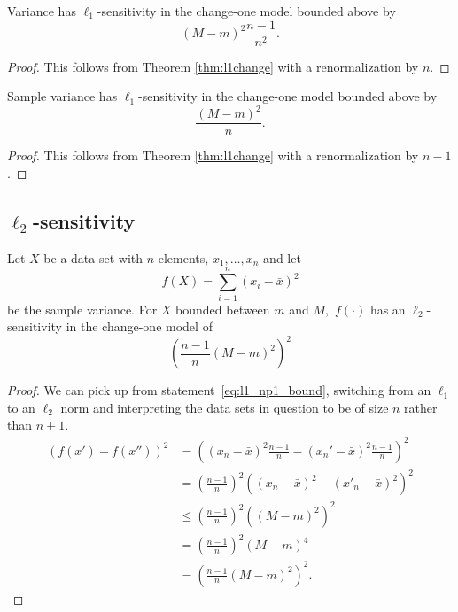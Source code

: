 \documentclass[11pt]{scrartcl} %
\begin{document}
\begin{corollary}
Variance has $\ell_1$-sensitivity in the change-one model bounded above by
$$ (M-m)^2 \frac{n-1}{n^2}. $$
\end{corollary}

\begin{proof}
This follows from Theorem \ref{thm:l1change} with a renormalization by $n$.
\end{proof}

\begin{corollary}
Sample variance has $\ell_1$-sensitivity in the change-one model bounded above by
$$ \frac{(M-m)^2 }{n}. $$
\end{corollary}

\begin{proof}
This follows from Theorem \ref{thm:l1change} with a renormalization by $n-1$.
\end{proof}

\subsection{$\ell_2$-sensitivity}
\begin{theorem}
\label{thm:l2change}
	Let $X$ be a data set with $n$ elements, $x_1, \hdots, x_n$ and let
	\[ f(X) = \sum_{i=1}^n (x_i - \bar{x})^2 \]
	be the sample variance.
	For $X$ bounded between $m$ and $M,$ $f(\cdot)$ has an $\ell_2$-sensitivity in the change-one model of
	\[ \left( \frac{n-1}{n} (M-m)^2 \right)^2 \]
\end{theorem}

\begin{proof}
	We can pick up from statement~\ref{eq:l1_np1_bound}, switching from an $\ell_1$ to an $\ell_2$ norm and interpreting the data sets in question to be of size $n$ rather than $n+1$.
	\begin{align*}
		(f(x') - f(x''))^2
			&= \left( (x_{n}-\bar{x})^2 \frac{n-1}{n} - (x_{n}'-\bar{x})^2 \frac{n-1}{n} \right)^2 \\
			&= \left( \frac{n-1}{n} \right)^2 \left( (x_n - \bar{x})^2 - (x'_n - \bar{x})^2 \right)^2 \\
			&\leq \left( \frac{n-1}{n} \right)^2 \left( (M-m)^2 \right)^2 \\
			&= \left( \frac{n-1}{n} \right)^2 (M - m)^4 \\
			&= \left( \frac{n-1}{n} (M - m)^2 \right)^2.
	\end{align*}
\end{proof}
\end{document}
